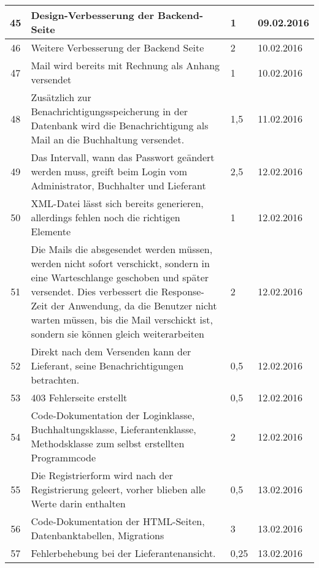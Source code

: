 \begin{longtable}[h]{| c | p{11.6cm} | l | l |}
45 & Design-Verbesserung der Backend-Seite & 1 & 09.02.2016 \\ \hline

46 & Weitere Verbesserung der Backend Seite & 2 & 10.02.2016 \\ \hline

47 & Mail wird bereits mit Rechnung als Anhang versendet & 1 & 10.02.2016 \\ \hline

48 & Zusätzlich zur Benachrichtigungsspeicherung in der Datenbank wird die Benachrichtigung als Mail an die Buchhaltung versendet. & 1,5 & 11.02.2016 \\ \hline

49 & Das Intervall, wann das Passwort geändert werden muss, greift beim Login vom Administrator, Buchhalter und Lieferant & 2,5 & 12.02.2016 \\ \hline

50 & XML-Datei lässt sich bereits generieren, allerdings fehlen noch die richtigen Elemente & 1 & 12.02.2016 \\ \hline

51 & Die Mails die absgesendet werden müssen, werden nicht sofort verschickt, sondern in eine Warteschlange geschoben und später versendet. Dies verbessert die Response-Zeit der Anwendung, da die Benutzer nicht warten müssen, bis die Mail verschickt ist, sondern sie können gleich weiterarbeiten & 2 & 12.02.2016 \\ \hline

52 & Direkt nach dem Versenden kann der Lieferant, seine Benachrichtigungen betrachten. & 0,5 & 12.02.2016 \\ \hline

53 & 403 Fehlerseite erstellt & 0,5  & 12.02.2016 \\ \hline

54 & Code-Dokumentation der Loginklasse, Buchhaltungsklasse, Lieferantenklasse, Methodsklasse zum selbst erstellten Programmcode & 2 & 12.02.2016 \\ \hline

55 & Die Registrierform wird nach der Registrierung geleert, vorher blieben alle Werte darin enthalten & 0,5 & 13.02.2016 \\ \hline

56 & Code-Dokumentation der HTML-Seiten, Datenbanktabellen, Migrations & 3 & 13.02.2016 \\ \hline

57 & Fehlerbehebung bei der Lieferantenansicht. & 0,25 & 13.02.2016 \\ \hline


\end{longtable}
